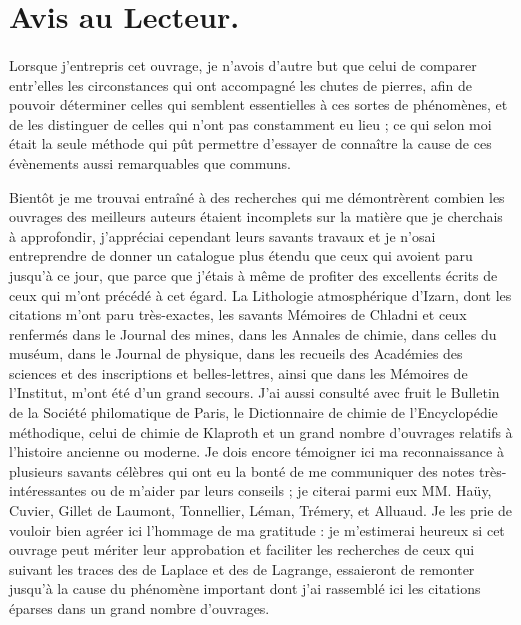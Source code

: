 \documentclass[a4paper, 12pt, oneside, french]{article}
\begin{document}
\setlength{\parskip}{1mm plus1mm minus1mm}
\clearpage
\frenchspacing
\tableofcontents
\clearpage
\pagestyle{fancy}
\fancyhf{}
\rhead{}
\cfoot{\thepage}
\section*{Avis au Lecteur.}
\paragraph{}
Lorsque j'entrepris cet ouvrage, je n'avois d'autre but que celui de comparer entr’elles les circonstances qui ont accompagné les chutes de pierres, afin de pouvoir déterminer celles qui semblent essentielles à ces sortes de phénomènes, et de les distinguer de celles qui n'ont pas constamment eu lieu ; ce qui selon moi était la seule méthode qui pût permettre d'essayer de connaître la cause de ces évènements aussi remarquables que communs.

Bientôt je me trouvai entraîné à des recherches qui me démontrèrent combien les ouvrages des meilleurs auteurs étaient incomplets sur la matière que je cherchais à approfondir, j'appréciai cependant leurs savants travaux et je n'osai entreprendre de donner un catalogue plus étendu que ceux qui avoient paru jusqu'à ce jour, que parce que j'étais à même de profiter des excellents écrits de ceux qui m'ont précédé à cet égard. La Lithologie atmosphérique d'Izarn, dont les citations m'ont paru très-exactes, les savants Mémoires de Chladni et ceux renfermés dans le Journal des mines, dans les Annales de chimie, dans celles du muséum, dans le Journal de physique, dans les recueils des Académies des sciences et des inscriptions et belles-lettres, ainsi que dans les Mémoires de l'Institut, m'ont été d'un grand secours. J'ai aussi consulté avec fruit le Bulletin de la Société philomatique de Paris, le Dictionnaire de chimie de l’Encyclopédie méthodique, celui de chimie de Klaproth et un grand nombre d'ouvrages relatifs à l'histoire ancienne ou moderne. Je dois encore témoigner ici ma reconnaissance à plusieurs savants célèbres qui ont eu la bonté de me communiquer des notes très-intéressantes ou de m'aider par leurs conseils ; je citerai parmi eux MM. Haüy, Cuvier, Gillet de Laumont, Tonnellier, Léman, Trémery, et Alluaud. Je les prie de vouloir bien agréer ici l'hommage de ma gratitude : je m'estimerai heureux si cet ouvrage peut mériter leur approbation et faciliter les recherches de ceux qui suivant les traces des de Laplace et des de Lagrange, essaieront de remonter jusqu'à la cause du phénomène important dont j'ai rassemblé ici les citations éparses dans un grand nombre d'ouvrages.
\end{document}
